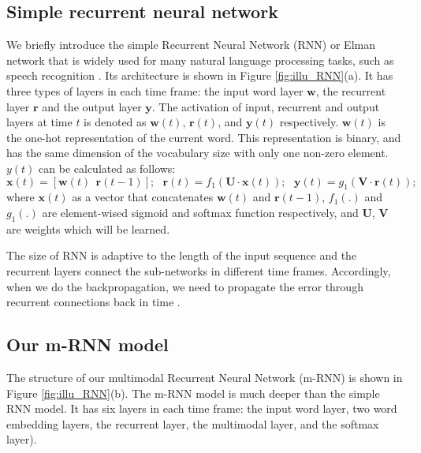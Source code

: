 \subsection{Simple recurrent neural network}
\label{sec:sRNN}
We briefly introduce the simple Recurrent Neural Network (RNN) or Elman network \cite{elman1990finding} that is widely used for many natural language processing tasks, such as speech recognition \cite{mikolov2010recurrent,mikolov2011extensions}.
Its architecture is shown in Figure \ref{fig:illu_RNN}(a).
It has three types of layers in each time frame: the input word layer $\mathbf{w}$, the recurrent layer $\mathbf{r}$ and the output layer $\mathbf{y}$.
The activation of input, recurrent and output layers at time $t$ is denoted as $\mathbf{w}(t)$, $\mathbf{r}(t)$, and $\mathbf{y}(t)$ respectively.
$\mathbf{w}(t)$ is the one-hot representation of the current word. 
This representation is binary, and has the same dimension of the vocabulary size with only one non-zero element.
$y(t)$ can be calculated as follows:
\begin{equation}
\mathbf{x}(t) = [\mathbf{w}(t)\ \ \mathbf{r}(t-1)];\ \ \ 
\mathbf{r}(t)=f_1(\mathbf{U} \cdot \mathbf{x}(t));\ \ \ 
\mathbf{y}(t)=g_1(\mathbf{V} \cdot \mathbf{r}(t));
\end{equation}
where $\mathbf{x}(t)$ as a vector that concatenates $\mathbf{w}(t)$ and $\mathbf{r}(t-1)$, $f_1(.)$ and $g_1(.)$ are element-wised sigmoid and softmax function respectively, and $\mathbf{U}$, $\mathbf{V}$ are weights which will be learned.

The size of RNN is adaptive to the length of the input sequence and the recurrent layers connect the sub-networks in different time frames.
Accordingly, when we do the backpropagation, we need to propagate the error through recurrent connections back in time \cite{rumelhart1988learning}.


\subsection{Our m-RNN model}
The structure of our multimodal Recurrent Neural Network (m-RNN) is shown in Figure \ref{fig:illu_RNN}(b).
The m-RNN model is much deeper than the simple RNN model.
It has six layers in each time frame: the input word layer, two word embedding layers, the recurrent layer, the multimodal layer, and the softmax layer).

